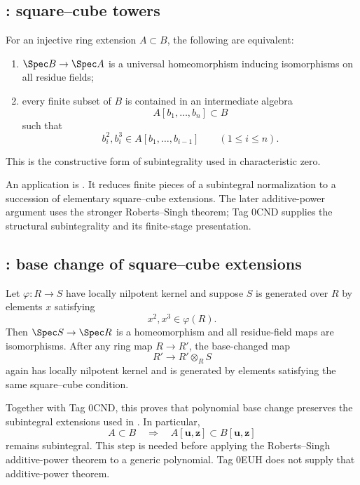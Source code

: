 \subsection*{: square--cube towers}
\label{sec:stacks-tag-0CND}

For an injective ring extension \(A\subset B\), the following are equivalent:
\begin{enumerate}
\item \(\Spec B\to\Spec A\) is a universal homeomorphism inducing
isomorphisms on all residue fields;
\item every finite subset of \(B\) is contained in an intermediate algebra
\[
                         A[b_1,\ldots,b_n]\subset B
\]
such that
\[
             b_i^2,b_i^3\in A[b_1,\ldots,b_{i-1}]
             \qquad(1\leq i\leq n).
\]
\end{enumerate}
This is the constructive form of subintegrality used in characteristic
zero.

An application is .
It reduces finite pieces of a subintegral normalization to a succession of
elementary square--cube extensions. The later additive-power argument uses
the stronger Roberts--Singh theorem; Tag 0CND supplies the structural
subintegrality and its finite-stage presentation.

\subsection*{: base change of square--cube extensions}
\label{sec:stacks-tag-0EUH}

Let \(\varphi:R\to S\) have locally nilpotent kernel and suppose \(S\) is
generated over \(R\) by elements \(x\) satisfying
\[
                         x^2,x^3\in\varphi(R).
\]
Then \(\Spec S\to\Spec R\) is a homeomorphism and all residue-field maps are
isomorphisms. After any ring map \(R\to R'\), the base-changed map
\[
                         R'\longrightarrow R'\otimes_RS
\]
again has locally nilpotent kernel and is generated by elements satisfying
the same square--cube condition.

Together with Tag 0CND, this proves that polynomial base change preserves
the subintegral extensions used in
. In particular,
\[
                         A\subset B
             \quad\Longrightarrow\quad
                         A[\mathbf u,\mathbf z]
                         \subset B[\mathbf u,\mathbf z]
\]
remains subintegral. This step is needed before applying the
Roberts--Singh additive-power theorem to a generic polynomial. Tag 0EUH
does not supply that additive-power theorem.

